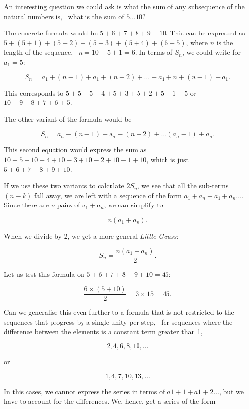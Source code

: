 \documentclass{scrreprt}
\begin{document}
An interesting question we could ask is what the sum of
any subsequence of the natural numbers is, \eg\ what is the sum of
$5\dots 10$?

The concrete formula would be
$5+6+7+8+9+10$.
This can be expressed as
$5 + (5+1) + (5+2) + (5+3) + (5+4) + (5+5)$, where $n$
is the length of the sequence, \ie\ $n=10-5+1=6$.
In terms of $S_n$, we could write for $a_1=5$:

\begin{equation}
S_n = a_1 + (n-1) + a_1 + (n-2) + \dots + a_1 + n+(n-1) + a_1.
\end{equation}

This corresponds to $5 + 5 + 5 + 4 + 5 + 3 + 5 + 2 + 5 + 1 + 5$ or
$10 + 9 + 8 + 7 + 6 + 5$.

The other variant of the formula would be

\begin{equation}
S_n = a_n - (n - 1) + a_n - (n-2) + \dots (a_n -1) + a_n.
\end{equation}

This second equation would express the sum as
$10 - 5 + 10 - 4 + 10 - 3 + 10 - 2 + 10 -1 + 10$, which is
just $5 + 6 + 7 + 8 + 9 + 10$.

If we use these two variants to calculate $2S_n$, we see
that all the sub-terms $(n-k)$ fall away, we are left with
a sequence of the form $a_1 + a_n + a_1 + a_n\dots$.
Since there are $n$ pairs of $a_1 + a_n$, we can simplify
to

\[
n(a_1 + a_n).
\]

When we divide by 2, we get a more general \emph{Little Gauss}:

\begin{equation}
S_n = \frac{n(a_1 + a_n)}{2}.
\end{equation}

Let us test this formula on $5+6+7+8+9+10 = 45$:

\[
\frac{6\times (5+10)}{2} = 3\times 15 = 45.
\]

Can we generalise this even further to a formula
that is not restricted to the sequences that progress
by a single unity per step, \ie\ for sequences
where the difference between the elements is a constant
term greater than 1, \eg\:

\[
2, 4, 6, 8, 10, \dots
\]

or

\[
1, 4, 7, 10, 13, \dots
\]

In this cases, we cannot express the series in terms of
$a1 + 1 + a1 + 2\dots$, but we have to account for the
differences. We, hence, get a series of the form
\end{document}
